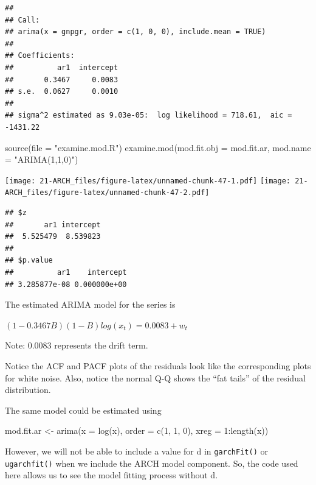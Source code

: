 \documentclass[
]{book}
\newenvironment{Shaded}{\begin{snugshade}}{\end{snugshade}}
\newcommand{\AttributeTok}[1]{\textcolor[rgb]{0.77,0.63,0.00}{#1}}
\newcommand{\DecValTok}[1]{\textcolor[rgb]{0.00,0.00,0.81}{#1}}
\newcommand{\FunctionTok}[1]{\textcolor[rgb]{0.00,0.00,0.00}{#1}}
\newcommand{\NormalTok}[1]{#1}
\newcommand{\OtherTok}[1]{\textcolor[rgb]{0.56,0.35,0.01}{#1}}
\newcommand{\SpecialCharTok}[1]{\textcolor[rgb]{0.00,0.00,0.00}{#1}}
\newcommand{\StringTok}[1]{\textcolor[rgb]{0.31,0.60,0.02}{#1}}
\theoremstyle{definition}
\theoremstyle{definition}
\theoremstyle{definition}
\theoremstyle{definition}
\theoremstyle{remark}
\begin{document}
\begin{verbatim}
## 
## Call:
## arima(x = gnpgr, order = c(1, 0, 0), include.mean = TRUE)
## 
## Coefficients:
##          ar1  intercept
##       0.3467     0.0083
## s.e.  0.0627     0.0010
## 
## sigma^2 estimated as 9.03e-05:  log likelihood = 718.61,  aic = -1431.22
\end{verbatim}

\begin{Shaded}
\begin{Highlighting}[]
\FunctionTok{source}\NormalTok{(}\AttributeTok{file =} \StringTok{"examine.mod.R"}\NormalTok{)}
\FunctionTok{examine.mod}\NormalTok{(}\AttributeTok{mod.fit.obj =}\NormalTok{ mod.fit.ar, }\AttributeTok{mod.name =} 
   \StringTok{"ARIMA(1,1,0)"}\NormalTok{)}
\end{Highlighting}
\end{Shaded}

\texttt{[image: 21-ARCH\_files/figure-latex/unnamed-chunk-47-1.pdf]} \texttt{[image: 21-ARCH\_files/figure-latex/unnamed-chunk-47-2.pdf]}

\begin{verbatim}
## $z
##       ar1 intercept 
##  5.525479  8.539823 
## 
## $p.value
##          ar1    intercept 
## 3.285877e-08 0.000000e+00
\end{verbatim}

The estimated ARIMA model for the series is

\((1-0.3467B)(1-B)log(x_t)=0.0083+w_t\)

Note: 0.0083 represents the drift term.

Notice the ACF and PACF plots of the residuals look like the corresponding plots for white noise. Also, notice the normal Q-Q shows the ``fat tails'' of the residual distribution.

The same model could be estimated using

\begin{Shaded}
\begin{Highlighting}[]
\NormalTok{mod.fit.ar }\OtherTok{\textless{}{-}} \FunctionTok{arima}\NormalTok{(}\AttributeTok{x =} \FunctionTok{log}\NormalTok{(x), }\AttributeTok{order =} \FunctionTok{c}\NormalTok{(}\DecValTok{1}\NormalTok{, }\DecValTok{1}\NormalTok{, }\DecValTok{0}\NormalTok{), xreg }
      \OtherTok{=} \DecValTok{1}\SpecialCharTok{:}\FunctionTok{length}\NormalTok{(x))}
\end{Highlighting}
\end{Shaded}

However, we will not be able to include a value for d in \texttt{garchFit()} or \texttt{ugarchfit()} when we include the ARCH model component. So, the code used here allows us to see the model fitting process without d.~
\end{document}
